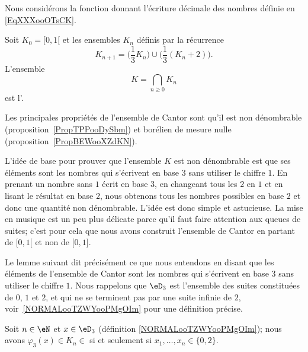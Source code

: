 Nous considérons la fonction donnant l'écriture décimale des nombres définie en \eqref{EqXXXooOTsCK}.

\begin{definition}  \label{DefIYDooVIDJs}
	Soit \( K_0=\mathopen[ 0 , 1 [\) et les ensembles \( K_n\) définis par la récurrence
	\begin{equation}
		K_{n+1}=\big( \frac{1}{ 3 }K_n \big)\cup\big( \frac{1}{ 3 }(K_n+2) \big).
	\end{equation}
	L'ensemble
	\begin{equation}
		K=\bigcap_{n\geq 0}K_n
	\end{equation}
	est l'.
\end{definition}
Les principales propriétés de l'ensemble de Cantor sont qu'il est non dénombrable (proposition~\ref{PropTPPooDySbm}) et borélien de mesure nulle (proposition~\ref{PropBEWooXZdKN}).

\begin{normaltext}
	L'idée de base pour prouver que l'ensemble \( K\) est non dénombrable est que ses éléments sont les nombres qui s'écrivent en base \( 3\) sans utiliser le chiffre \( 1\). En prenant un nombre sans \( 1\) écrit en base \( 3\), en changeant tous les \( 2\) en \( 1\) et en lisant le résultat en base \( 2\), nous obtenons tous les nombres possibles en base \( 2\) et donc une quantité non dénombrable. L'idée est donc simple et astucieuse. La mise en musique est un peu plus délicate parce qu'il faut faire attention aux queues de suites; c'est pour cela que nous avons construit l'ensemble de Cantor en partant de \( \mathopen[ 0 , 1 [\) et non de \( \mathopen[ 0 , 1 \mathclose]\).
\end{normaltext}

Le lemme suivant dit précisément ce que nous entendons en disant que les éléments de l'ensemble de Cantor sont les nombres qui s'écrivent en base \( 3\) sans utiliser le chiffre \( 1\). Nous rappelons que \( \eD_3\) est l'ensemble des suites constituées de \( 0\), \( 1\) et \( 2\), et qui ne se terminent pas par une suite infinie de \( 2\), voir~\ref{NORMALooTZWYooPMgOIm} pour une définition précise.
\begin{lemma}   \label{LemAZGoosKzEm}
	Soit \( n\in \eN\) et \( x\in \eD_3\) (définition \ref{NORMALooTZWYooPMgOIm}); nous avons \( \varphi_3(x)\in K_n\in\) si et seulement si \( x_1,\ldots, x_n\in\{ 0,2 \}\).
\end{lemma}

